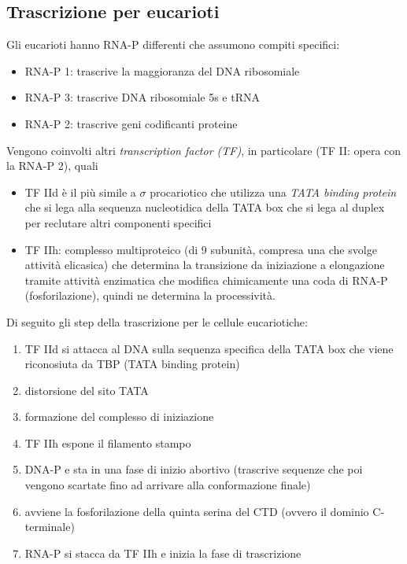     \subsection{Trascrizione per eucarioti}
        Gli eucarioti hanno RNA-P differenti che assumono compiti specifici:
        \begin{itemize}
            \item RNA-P 1: trascrive la maggioranza del DNA ribosomiale 
            \item RNA-P 3: trascrive DNA ribosomiale 5s e tRNA
            \item RNA-P 2: trascrive geni codificanti proteine
        \end{itemize}
        Vengono coinvolti altri \textit{transcription factor (TF)}, in particolare (TF II: opera con la RNA-P 2), quali 
        \begin{itemize} 
            \item TF IId è il più simile a $\sigma$ procariotico che utilizza una \textit{TATA binding protein} che si lega alla sequenza nucleotidica della TATA box che si lega al duplex per reclutare altri componenti specifici
            \item TF IIh: complesso multiproteico (di 9 subunità, compresa una che svolge attività elicasica) che determina la transizione da iniziazione a elongazione tramite attività enzimatica che modifica chimicamente una coda di RNA-P (fosforilazione), quindi ne determina la processività.
        \end{itemize}
        Di seguito gli step della trascrizione per le cellule eucariotiche:
        \begin{enumerate}
            \item TF IId si attacca al DNA sulla sequenza specifica della TATA box che viene riconosiuta da TBP (TATA binding protein)
            \item distorsione del sito TATA
            \item formazione del complesso di iniziazione
            \item TF IIh espone il filamento stampo
            \item DNA-P e sta in una fase di inizio abortivo (trascrive sequenze che poi vengono scartate fino ad arrivare alla conformazione finale)
            \item avviene la fosforilazione della quinta serina del CTD (ovvero il dominio C-terminale)
            \item RNA-P si stacca da TF IIh e inizia la fase di trascrizione
        \end{enumerate}
        
